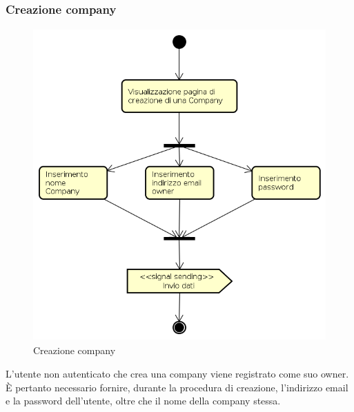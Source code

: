 \subsubsection{Creazione company}
\begin{figure}[H]
\begin{center}
\includegraphics[height=12cm]{res/sections/backend/activities/creazioneCompany.png}
\caption{Creazione company}
\end{center}
\end{figure}
L'utente non autenticato che crea una company viene registrato come suo owner. È pertanto necessario fornire, durante la procedura di creazione, l'indirizzo email e la password dell'utente, oltre che il nome della company stessa.
\newpage
